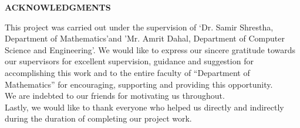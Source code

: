



\begin{center}
	{\Large{\bf{ACKNOWLEDGMENTS}}}\\
\end{center}

\noindent

This project was carried out under the supervision of `Dr. Samir Shrestha, Department of Mathematics'and 'Mr. Amrit Dahal, Department of Computer Science and Engineering'. We would like to express our sincere gratitude towards our supervisors for  excellent supervision, guidance and suggestion for accomplishing this work and to the entire faculty of ``Department of Mathematics'' for encouraging, supporting and providing this opportunity.\\

\noindent
We are indebted to our friends for motivating us throughout. \\


\noindent
Lastly, we would like to thank everyone who helped us directly and indirectly during the duration of completing our project work.



